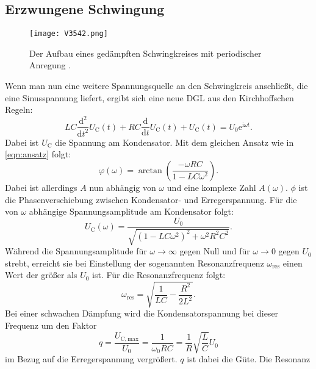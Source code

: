 \documentclass[
  bibliography=totoc,     %
  captions=tableheading,  %
  titlepage=firstiscover, %
]{scrartcl}
\begin{document}
\subsection{Erzwungene Schwingung}
\label{sub:erzwungen}
\begin{figure}[htb]
  \centering
  \texttt{[image: V3542.png]}
  \caption{Der Aufbau eines gedämpften Schwingkreises mit periodischer Anregung \cite{anleitung}.}
  \label{fig:V3542}
\end{figure}
Wenn man nun eine weitere Spannungsquelle an den Schwingkreis anschließt, die
eine Sinusspannung liefert, ergibt sich eine neue DGL aus den Kirchhoffschen Regeln:
\begin{equation}
    LC\frac{\mathup{d}^2}{\mathup{d}t^2}U_{\mathup{C}}(t)+RC\frac{\mathup{d}}{\mathup{d}t}U_{\mathup{C}}(t)+U_{\mathup{C}}(t)=U_0\mathup{e}^{\mathup{i}\omega t}.
    \label{eqn:dgl2}
\end{equation}
Dabei ist $U_\mathup{C}$ die Spannung am Kondensator. Mit dem gleichen Ansatz wie in
\eqref{eqn:ansatz} folgt:
\begin{equation}
    \varphi(\omega)=\arctan\left(\frac{-\omega RC}{1-LC\omega^2}\right).
    \label{eqn:phase}
\end{equation}
Dabei ist allerdings $A$ nun abhängig von $\omega$ und eine komplexe Zahl $A(\omega)$.
$\phi$ ist die Phasenverschiebung zwischen Kondensator- und Erregerspannung.
Für die von $\omega$ abhängige Spannungsamplitude am Kondensator folgt:
\begin{equation}
    U_{\mathup{C}}(\omega)=\frac{U_0}{\sqrt{\left(1-LC\omega^2\right)^2+\omega^2R^2C^2}}.
    \label{eqn:amplitude}
\end{equation}
Während die Spannungsamplitude für $\omega\rightarrow\infty$ gegen Null und für
$\omega\rightarrow 0$ gegen $U_0$ strebt, erreicht sie bei Einstellung der
sogenannten Resonanzfrequenz $\omega_{\mathup{res}}$ einen Wert der größer als
$U_0$ ist. Für die Resonanzfrequenz folgt:
\begin{equation}
    \omega_{\mathup{res}}=\sqrt{\frac{1}{LC}-\frac{R^2}{2L^2}}.
    \label{eqn:resonanz}
\end{equation}
Bei einer schwachen Dämpfung wird die Kondensatorspannung bei dieser Frequenz um
den Faktor
\begin{equation}
    q=\frac{U_\mathup{C, max}}{U_0}=\frac{1}{\omega_0RC}=\frac{1}{R}\sqrt{\frac{L}{C}}U_0
    \label{eqn:guete}
\end{equation}
im Bezug auf die Erregerspannung vergrößert. $q$ ist dabei die Güte. Die Resonanz
\end{document}
